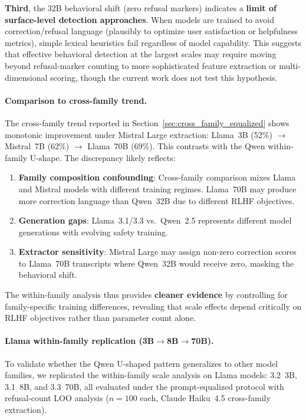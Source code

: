\textbf{Third}, the 32B behavioral shift (zero refusal markers) indicates a \textbf{limit of surface-level detection approaches}. When models are trained to avoid correction/refusal language (plausibly to optimize user satisfaction or helpfulness metrics), simple lexical heuristics fail regardless of model capability. This suggests that effective behavioral detection at the largest scales may require moving beyond refusal-marker counting to more sophisticated feature extraction or multi-dimensional scoring, though the current work does not test this hypothesis.

\paragraph{Comparison to cross-family trend.}
The cross-family trend reported in Section~\ref{sec:cross_family_equalized} shows monotonic improvement under Mistral Large extraction: Llama~3B (52\%) $\to$ Mistral~7B (62\%) $\to$ Llama~70B (69\%). This contrasts with the Qwen within-family U-shape. The discrepancy likely reflects:

\begin{enumerate}[leftmargin=*,itemsep=2pt]
\item \textbf{Family composition confounding}: Cross-family comparison mixes Llama and Mistral models with different training regimes. Llama~70B may produce more correction language than Qwen~32B due to different RLHF objectives.
\item \textbf{Generation gaps}: Llama~3.1/3.3 vs.\ Qwen~2.5 represents different model generations with evolving safety training.
\item \textbf{Extractor sensitivity}: Mistral Large may assign non-zero correction scores to Llama~70B transcripts where Qwen~32B would receive zero, masking the behavioral shift.
\end{enumerate}

The within-family analysis thus provides \textbf{cleaner evidence} by controlling for family-specific training differences, revealing that scale effects depend critically on RLHF objectives rather than parameter count alone.

\paragraph{Llama within-family replication (3B$\to$8B$\to$70B).}
To validate whether the Qwen U-shaped pattern generalizes to other model families, we replicated the within-family scale analysis on Llama models: 3.2~3B, 3.1~8B, and 3.3~70B, all evaluated under the prompt-equalized protocol with refusal-count LOO analysis ($n=100$ each, Claude Haiku~4.5 cross-family extraction).

